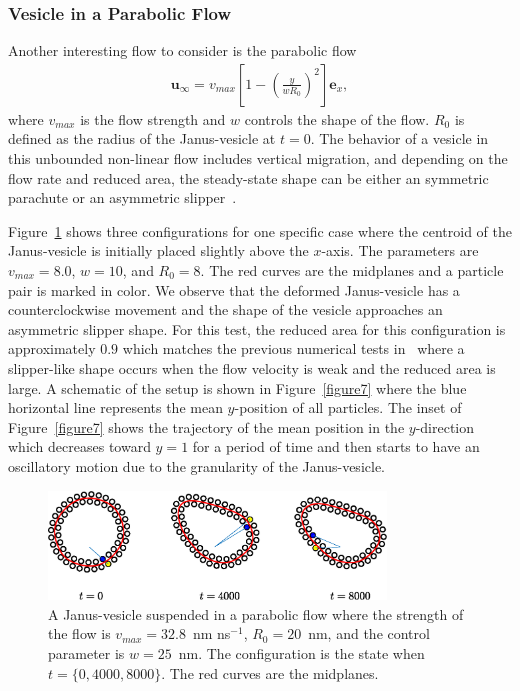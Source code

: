 \documentclass[lineno]{jfm}
\newcommand{\uu}{\mathbf{u}}
\begin{document}
\subsubsection{Vesicle in a Parabolic Flow}
Another interesting flow to consider is the parabolic flow
\begin{align}
  \uu_\infty = v_{max}\left[ 1 - \left( \frac{y}{wR_0}\right)^2
    \right]\mathbf{e}_x,
\end{align}
%
where $v_{max}$ is the flow strength and $w$ controls the shape of the
flow. $R_0$ is defined as the radius of the Janus-vesicle at $t=0$.
The behavior of a vesicle in this unbounded non-linear flow includes
vertical migration, and depending on the flow rate and reduced area,
the steady-state shape can be either an symmetric parachute or
an asymmetric slipper~\cite{Kaoui09, cou-kao-pod-mis2008,
dan-vla-mis2009}.


Figure~\ref{figure6} shows three configurations for one specific case
where the centroid of the Janus-vesicle is initially placed slightly
above the $x$-axis. The parameters are $v_{max} = 8.0$, $w=10$, and
$R_0=8$. The red curves are the midplanes and a particle pair is marked
in color. We observe that the deformed Janus-vesicle has a
counterclockwise movement and the shape of the vesicle approaches an
asymmetric slipper shape. For this test, the reduced area for this
configuration is approximately $0.9$ which matches the previous
numerical tests in~\cite{Kaoui09} where a slipper-like shape occurs when
the flow velocity is weak and the reduced area is large. A schematic of
the setup is shown in Figure~\ref{figure7} where the blue horizontal
line represents the mean $y$-position of all particles. The inset of
Figure~\ref{figure7} shows the trajectory of the mean position in the
$y$-direction which decreases toward $y=1$ for a period of time and then
starts to have an oscillatory motion due to the granularity of the
Janus-vesicle. 

\begin{figure}
\centering
\includegraphics[width=0.8\textwidth]{slipper.eps}
  \caption{\label{figure6} A Janus-vesicle suspended in a parabolic flow
  where the strength of the flow is $v_{max}=32.8$~nm ns$^{-1}$, $R_0 =
  20$~nm, and the control parameter is $w=25$~nm. The configuration is
  the state when $t=\{0, 4000, 8000\}$. The red curves are the
  midplanes.}
\end{figure}
\end{document}
